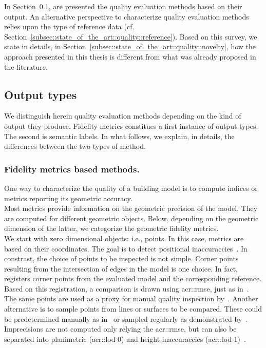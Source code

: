     In Section~\ref{subsec::state_of_the_art::quality::output}, are presented the quality evaluation methods based on their output.
    An alternative perspective to characterize quality evaluation methods relies upon the type of reference data (cf. Section~\ref{subsec::state_of_the_art::quality::reference}).
    Based on this survey, we state in details, in Section~\ref{subsec::state_of_the_art::quality::novelty}, how the approach presented in this thesis is different from what was already proposed in the literature.

    \subsection{Output types}
        \label{subsec::state_of_the_art::quality::output}
        We distinguish herein quality evaluation methods depending on the kind of output they produce.
        Fidelity metrics constitues a first instance of output types.
        The second is semantic labels.
        In what follows, we explain, in details, the differences between the two types of method.

        \subsubsection{Fidelity metrics based methods.}
            One way to characterize the quality of a building model is to compute indices or metrics reporting its geometric accuracy.\\

            Most metrics provide information on the geometric precision of the model.
            They are computed for different geometric objects.
            Below, depending on the geometric dimension of the latter, we categorize the geometric fidelity metrics.\\

            We start with zero dimensional objects: i.e., points.
            In this case, metrics are based on their coordinates.
            The goal is to detect positional inaccuraccies~\parencite{kaartinen2005accuracy}.
            In constrast, the choice of points to be inspected is not simple.
            Corner points resulting from the intersection of edges in the model is one choice.
            In fact,~\textcite{zeng2014multicriteria} registers corner points from the evaluated model and the corresponding reference.
            Based on this registration, a comparison is drawn using \acrfull{acr::rmse}, just as in~\parencite{you2011quality,landes2012quality}.
            The same points are used as a proxy for manual quality inspection by~\textcite{elberink2011quality}.
            Another alternative is to sample points from lines or surfaces to be compared.
            These could be predetermined manually as in~\parencite{kaartinen2005accuracy} or sampled regularly as demonstrated by~\textcite{vogtle2003quality,tran2019geometric}.
            Imprecisions are not computed only relying the \gls{acr::rmse}, but can also be separated into planimetric (\gls{acr::lod}-0) and height inaccuraccies (\gls{acr::lod}-1)~\parencite{vogtle2003quality,jaynes2003recognition,kaartinen2005accuracy}.\\

